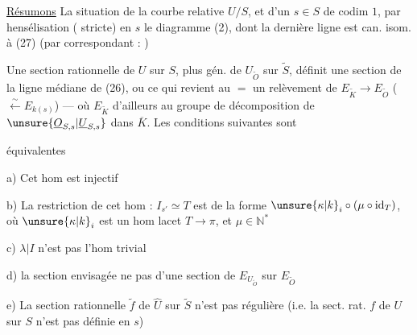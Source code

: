 \uline{Résumons} La situation de la courbe relative $U/S$, et d'un $s\in S$ de codim $1$,  par hensélisation ( stricte) en $s$ le diagramme (2), dont la dernière ligne est can. isom. à (27) (par   correspondant :
)

Une section rationnelle  de $U$ sur $S$, plus gén.  de $U_{\widetilde O}$ sur $\widetilde S$, définit une section  de la ligne médiane de (26), ou ce qui revient au $=$ un relèvement
de $E_{\widetilde K}\longrightarrow E_{\widetilde O}$ ($\xleftarrow{\sim}E_{k(s)}$) --- où $E_{\widetilde K}$  d'ailleurs  au groupe de décomposition de $\unsure{\underline O_{S,s}|\underline U_{S,s}}$ dans $\overline K$. Les conditions suivantes sont

équivalentes

a) Cet hom est injectif

b) La restriction de cet hom : $I_{s'}\simeq T$ est
de la forme $\unsure{\kappa|k}_i\circ(\mu\circ\operatorname{id}_T)$, où $\unsure{\kappa|k}_i$ est un
hom lacet $T\longrightarrow\pi$, et $\mu\in\mathbb N^{*}$

c) $\lambda\vert I$ n'est pas l'hom trivial

d) la section envisagée  ne  pas
d'une section de $E_{U_{\widetilde O}}$ sur $E_{\widetilde O}$

e) La section rationnelle  $\widetilde f$ de $\widehat U$ sur
$\widetilde S$ n'est pas régulière (i.e. la sect. rat.
$f$ de $U$ sur $S$ n'est pas définie en $s$)


